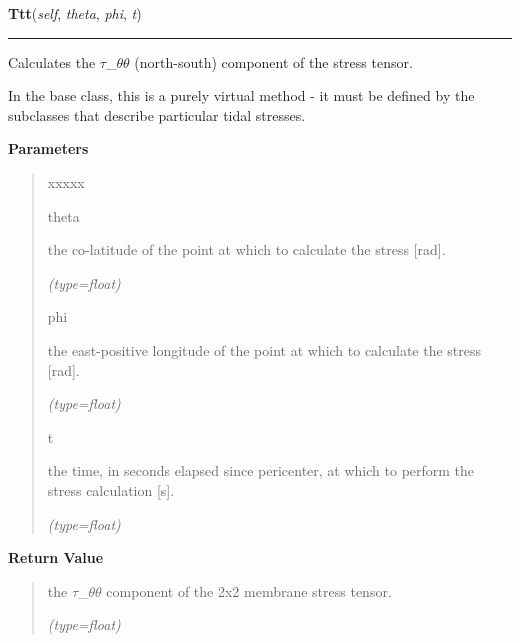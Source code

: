     \label{satstress:SatStress:StressDef:Ttt}

    \vspace{0.5ex}

\hspace{.8\funcindent}\begin{boxedminipage}{\funcwidth}

    \raggedright \textbf{Ttt}(\textit{self}, \textit{theta}, \textit{phi}, \textit{t})

    \vspace{-1.5ex}

    \rule{\textwidth}{0.5\fboxrule}
\setlength{\parskip}{2ex}
    Calculates the \(\tau\)\_\(\theta\)\(\theta\) (north-south) component 
    of the stress tensor.

    In the base class, this is a purely virtual method - it must be defined
    by the subclasses that describe particular tidal stresses.

\setlength{\parskip}{1ex}
      \textbf{Parameters}
      \vspace{-1ex}

      \begin{quote}
        \begin{Ventry}{xxxxx}

          \item[theta]

          the co-latitude of the point at which to calculate the stress 
          [rad].

            {\it (type=float)}

          \item[phi]

          the east-positive longitude of the point at which to calculate 
          the stress [rad].

            {\it (type=float)}

          \item[t]

          the time, in seconds elapsed since pericenter, at which to 
          perform the stress calculation [s].

            {\it (type=float)}

        \end{Ventry}

      \end{quote}

      \textbf{Return Value}
    \vspace{-1ex}

      \begin{quote}
      the \(\tau\)\_\(\theta\)\(\theta\) component of the 2x2 membrane 
      stress tensor.

      {\it (type=float)}

      \end{quote}

    \end{boxedminipage}


